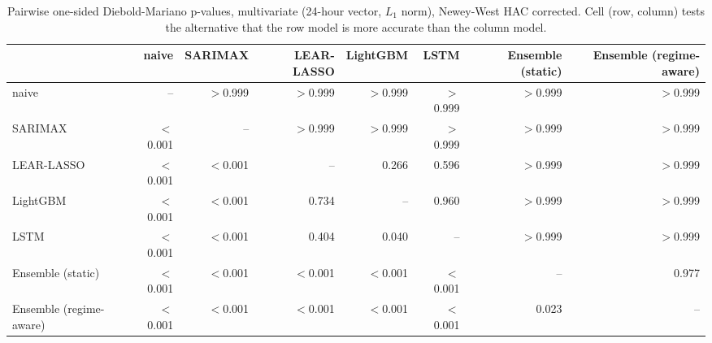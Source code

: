 \begin{table}[htbp]
\caption{Pairwise one-sided Diebold-Mariano p-values, multivariate (24-hour vector, $L_1$ norm), Newey-West HAC corrected. Cell (row, column) tests the alternative that the row model is more accurate than the column model.}
\label{tab:dm-tests}
\begin{tabular}{lrrrrrrr}
\toprule
 & naive & SARIMAX & LEAR-LASSO & LightGBM & LSTM & Ensemble (static) & Ensemble (regime-aware) \\
\midrule
naive & -- & $>$0.999 & $>$0.999 & $>$0.999 & $>$0.999 & $>$0.999 & $>$0.999 \\
SARIMAX & $<$0.001 & -- & $>$0.999 & $>$0.999 & $>$0.999 & $>$0.999 & $>$0.999 \\
LEAR-LASSO & $<$0.001 & $<$0.001 & -- & 0.266 & 0.596 & $>$0.999 & $>$0.999 \\
LightGBM & $<$0.001 & $<$0.001 & 0.734 & -- & 0.960 & $>$0.999 & $>$0.999 \\
LSTM & $<$0.001 & $<$0.001 & 0.404 & 0.040 & -- & $>$0.999 & $>$0.999 \\
Ensemble (static) & $<$0.001 & $<$0.001 & $<$0.001 & $<$0.001 & $<$0.001 & -- & 0.977 \\
Ensemble (regime-aware) & $<$0.001 & $<$0.001 & $<$0.001 & $<$0.001 & $<$0.001 & 0.023 & -- \\
\bottomrule
\end{tabular}
\end{table}
